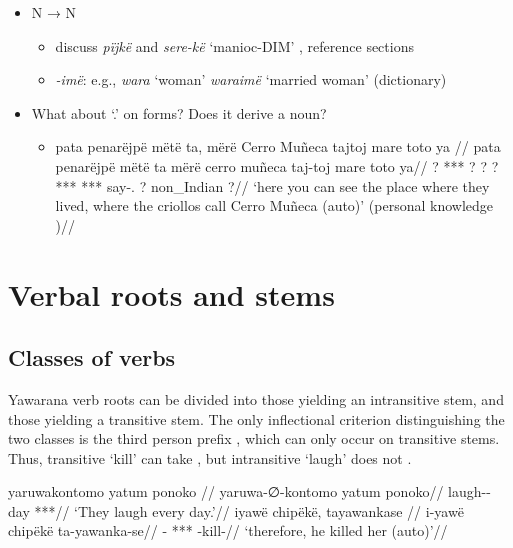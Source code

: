 \documentclass{memoir}
\begin{document}
\begin{itemize}
  \begin{itemize}
  \tightlist
  \item
     `'
  \end{itemize}
\item
  N → N

  \begin{itemize}
  \tightlist
  \item
    discuss \emph{pïjkë} and \emph{sere-kë} `manioc-DIM' , reference
    sections
  \item
    \emph{-imë}: e.g., \emph{wara} `woman' \emph{waraimë} `married
    woman' (dictionary)
  \end{itemize}
\item
  What about  `.' on  forms? Does
  it derive a noun?

  \begin{itemize}
  \item
    \ex \label{histyarirdi-592}
    \begingl \glpreamble pata penarëjpë mëtë ta, mërë Cerro Muñeca tajtoj mare toto ya //
    \gla pata penarëjpë mëtë ta mërë cerro muñeca taj-toj mare toto ya//
    \glb ? *** ? ? ? *** *** say-. ? non\_Indian ?//
    \glft ‘here you can see the place where they lived, where the criollos call Cerro Muñeca (auto)’ (personal knowledge
    )//
    \endgl
    \xe
  \end{itemize}
\end{itemize}

\chapter{\texorpdfstring{Verbal roots and stems
\label{verbderiv}}{Verbal roots and stems }}

\section{Classes of verbs}

Yawarana verb roots can be divided into those yielding an intransitive
stem, and those yielding a transitive stem. The only inflectional
criterion distinguishing the two classes is the third person prefix
, which can only occur on transitive stems. Thus, transitive
 `kill' can take  , but
intransitive  `laugh' does not .

\pex\label{}    \a     \label{convrisamaj-42}        \begingl
        \glpreamble yaruwakontomo yatum ponoko //
        \gla yaruwa-∅-kontomo yatum ponoko//
        \glb laugh-- day ***//
            \glft ‘They laugh every day.’//  
        \endgl 
    \a     \label{convfemgrme-217}        \begingl
        \glpreamble iyawë chipëkë, tayawankase //
        \gla i-yawë chipëkë ta-yawanka-se//
        \glb {}- *** -kill-//
            \glft ‘therefore, he killed her (auto)’//  
        \endgl 
\xe
\end{document}
